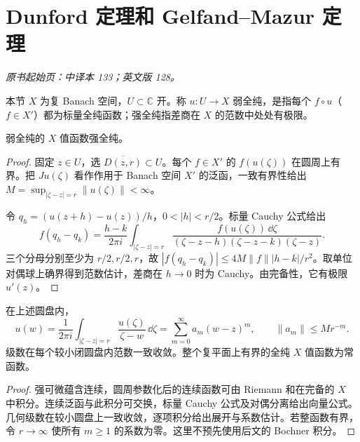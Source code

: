 \section{Dunford 定理和 Gelfand--Mazur 定理}\label{sec:yosida-05-03}
\noindent\textit{原书起始页：中译本 133；英文版 128。}

本节 $X$ 为复 Banach 空间，$U\subset\mathbb C$ 开。称 $u:U\to X$ 弱全纯，是指每个 $f\circ u$（$f\in X'$）都为标量全纯函数；强全纯指差商在 $X$ 的范数中处处有极限。

\begin{theorem}\label{thm:y5-dunford}
弱全纯的 $X$ 值函数强全纯。
\end{theorem}
\begin{proof}
固定 $z\in U$，选 $\overline{D(z,r)}\subset U$。每个 $f\in X'$ 的 $f(u(\zeta))$ 在圆周上有界。把 $Ju(\zeta)$ 看作作用于 Banach 空间 $X'$ 的泛函，一致有界性给出 $M=\sup_{|\zeta-z|=r}\|u(\zeta)\|<\infty$。

令 $q_h=(u(z+h)-u(z))/h$，$0<|h|<r/2$。标量 Cauchy 公式给出
\[
 f(q_h-q_k)=\frac{h-k}{2\pi i}\int_{|\zeta-z|=r}
 \frac{f(u(\zeta))\,\dd\zeta}{(\zeta-z-h)(\zeta-z-k)(\zeta-z)}.
\]
三个分母分别至少为 $r/2,r/2,r$，故 $|f(q_h-q_k)|\le4M\|f\||h-k|/r^2$。取单位对偶球上确界得到范数估计，差商在 $h\to0$ 时为 Cauchy。由完备性，它有极限 $u'(z)$。
\end{proof}

\begin{corollary}
在上述圆盘内，
\[
 u(w)=\frac1{2\pi i}\int_{|\zeta-z|=r}\frac{u(\zeta)}{\zeta-w}\,\dd\zeta
 =\sum_{m=0}^{\infty}a_m(w-z)^m,\qquad \|a_m\|\le Mr^{-m}.
\]
级数在每个较小闭圆盘内范数一致收敛。整个复平面上有界的全纯 $X$ 值函数为常函数。
\end{corollary}
\begin{proof}
强可微蕴含连续，圆周参数化后的连续函数可由 Riemann 和在完备的 $X$ 中积分。连续泛函与此积分可交换，标量 Cauchy 公式及对偶分离给出向量公式。几何级数在较小圆盘上一致收敛，逐项积分给出展开与系数估计。若整函数有界，令 $r\to\infty$ 使所有 $m\ge1$ 的系数为零。这里不预先使用后文的 Bochner 积分。
\end{proof}

